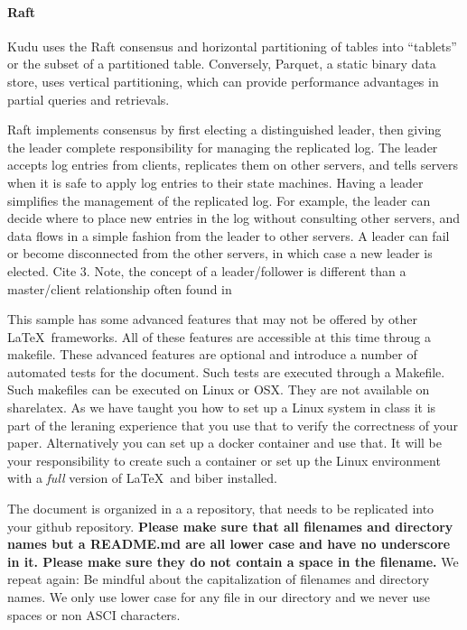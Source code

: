 \paragraph{Raft}
Kudu uses the Raft consensus and horizontal partitioning of tables into ``tablets'' or the subset of a partitioned table. Conversely, Parquet, a static binary data store, uses vertical partitioning, which can provide performance advantages in partial queries and retrievals. 

Raft implements consensus by first electing a distinguished leader, then giving the leader complete responsibility for managing the replicated log. The leader accepts log entries from clients, replicates them on other servers, and tells servers when it is safe to apply log entries to their state machines. Having a leader simplifies the management of the replicated log. For example, the leader can decide where to place new entries in the log without consulting other servers, and data flows in a simple fashion from the leader to other servers. A leader can fail or become disconnected from the other servers, in which case a new leader is elected.  Cite 3. Note, the concept of a leader/follower is different than a master/client relationship often found in 

This sample has some advanced features that may not be offered by
other \LaTeX\ frameworks. All of these features are accessible at this
time throug a makefile. These advanced features are optional and
introduce a number of automated tests for the document. Such tests are
executed through a Makefile. Such makefiles can be executed on Linux
or OSX. They are not available on sharelatex. As we have taught you
how to set up a Linux system in class it is part of the leraning
experience that you use that to verify the correctness of your
paper. Alternatively you can set up a docker container and use
that. It will be your responsibility to create such a container or set
up the Linux environment with a \textit{full} version of \LaTeX\ and biber
installed.

The document is organized in a a repository, that needs to be
replicated into your github repository. {\bf Please make sure that all
  filenames and directory names but a README.md are all lower case and
  have no underscore in it. Please make sure they do not contain a
  space in the filename.} We repeat again: Be mindful about the
capitalization of filenames and directory names. We only use lower
case for any file in our directory and we never use spaces or non ASCI
characters. 

